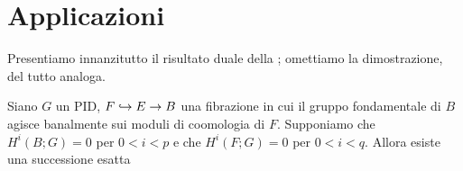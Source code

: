 \section{Applicazioni}
Presentiamo innanzitutto il risultato duale della ; omettiamo la dimostrazione, del tutto analoga.
\begin{proposition}
Siano $G$ un PID, $F\hookrightarrow E\to B$ una fibrazione in cui il gruppo fondamentale di $B$ agisce banalmente sui moduli di coomologia di $F$. Supponiamo che $H^i(B;G)=0$ per $0<i<p$ e che $H^i(F;G)=0$ per $0<i<q$. Allora esiste una successione esatta
\end{proposition}

